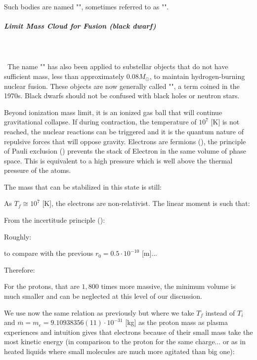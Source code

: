 	Such bodies are named "", sometimes referred to as "".
	
	\pagebreak
	\subparagraph{Limit Mass Cloud for Fusion (black dwarf)}\mbox{}\\\\\
	The name "" has also been applied to substellar objects that do not have sufficient mass, less than approximately $0.08 M_\odot$, to maintain hydrogen-burning nuclear fusion. These objects are now generally called "", a term coined in the 1970s. Black dwarfs should not be confused with black holes or neutron stars.
	
	Beyond ionization mass limit, it is an ionized gas ball that will continue gravitational collapse. If during contraction, the temperature of $10^ 7$ [K] is not reached, the nuclear reactions can be triggered and it is the quantum nature of repulsive forces that will oppose gravity. Electrons are fermions (), the principle of Pauli exclusion () prevents the stack of Electron in the same volume of phase space. This is equivalent to a high pressure which is well above the thermal pressure of the atoms.
	
	The mass that can be stabilized in this state is still:
	
	As $T_f\cong 10^7$ [K], the electrons are non-relativist. The linear moment is such that:
	
	From the incertitude principle ():
	
	Roughly:
	
	to compare with the previous $r_0=0.5\cdot 10^{-10}$ [m]...
	
	Therefore:
	
	For the protons, that are $1,800$ times more massive, the minimum volume is much smaller and can be neglected at this level of our discussion.
	
	We use now the same relation as previously but where we take $T_f$ instead of $T_i$ and $\overline{m}=m_e=9.10938356(11)\cdot 10^{-31}$ [kg] as the proton mass as plasma experiences and intuition gives that electrons because of their small mass take the most kinetic energy (in comparison to the proton for the same charge... or as in heated liquids where small molecules are much more agitated than big one):
	
